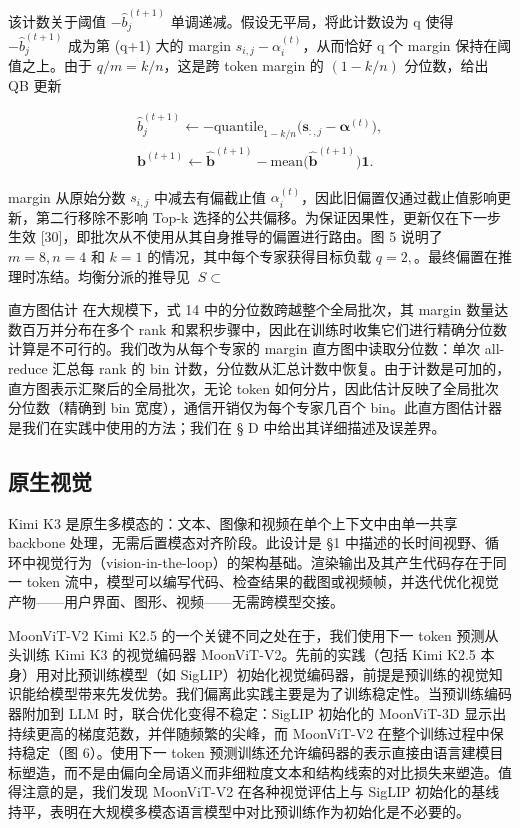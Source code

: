 该计数关于阈值 \(- \widehat { b } _ { j } ^ { ( t + 1 ) }\) 单调递减。假设无平局，将此计数设为 q 使得 \(- \widehat { b } _ { j } ^ { ( t + 1 ) }\) 成为第 (q+1) 大的 margin \(s _ { i , j } - \alpha _ { i } ^ { ( t ) }\)，从而恰好 q 个 margin 保持在阈值之上。由于 \(q / m = k / n\)，这是跨 token margin 的 \(( 1 - k / n )\) 分位数，给出 QB 更新

\[
\begin{array}{l} \widehat {b} _ {j} ^ {(t + 1)} \leftarrow - \text {quantile} _ {1 - k / n} \Big (\boldsymbol {s} _ {:, j} - \boldsymbol {\alpha} ^ {(t)} \Big), \\ \boldsymbol {b} ^ {(t + 1)} \leftarrow \widehat {\boldsymbol {b}} ^ {(t + 1)} - \text {mean} \Big (\widehat {\boldsymbol {b}} ^ {(t + 1)} \Big)   \mathbf {1}. \end{array}\tag{14}
\]

margin 从原始分数 \(s _ { i , j }\) 中减去有偏截止值 \(\alpha _ { i } ^ { ( t ) }\)，因此旧偏置仅通过截止值影响更新，第二行移除不影响 Top-k 选择的公共偏移。为保证因果性，更新仅在下一步生效 {[}30{]}，即批次从不使用从其自身推导的偏置进行路由。图 5 说明了 \(m = 8 , n = 4\) 和 \(k = 1\) 的情况，其中每个专家获得目标负载 \(q = 2 ,\)。最终偏置在推理时冻结。均衡分派的推导见 \(\ S \subset\)

直方图估计 在大规模下，式 14 中的分位数跨越整个全局批次，其 margin 数量达数百万并分布在多个 rank 和累积步骤中，因此在训练时收集它们进行精确分位数计算是不可行的。我们改为从每个专家的 margin 直方图中读取分位数：单次 all-reduce 汇总每 rank 的 bin 计数，分位数从汇总计数中恢复。由于计数是可加的，直方图表示汇聚后的全局批次，无论 token 如何分片，因此估计反映了全局批次分位数（精确到 bin 宽度），通信开销仅为每个专家几百个 bin。此直方图估计器是我们在实践中使用的方法；我们在 § D 中给出其详细描述及误差界。

\subsection{原生视觉}\label{native-vision}

Kimi K3 是原生多模态的：文本、图像和视频在单个上下文中由单一共享 backbone 处理，无需后置模态对齐阶段。此设计是 §1 中描述的长时间视野、循环中视觉行为（vision-in-the-loop）的架构基础。渲染输出及其产生代码存在于同一 token 流中，模型可以编写代码、检查结果的截图或视频帧，并迭代优化视觉产物——用户界面、图形、视频——无需跨模型交接。

MoonViT-V2 Kimi K2.5 的一个关键不同之处在于，我们使用下一 token 预测从头训练 Kimi K3 的视觉编码器 MoonViT-V2。先前的实践（包括 Kimi K2.5 本身）用对比预训练模型（如 SigLIP）初始化视觉编码器，前提是预训练的视觉知识能给模型带来先发优势。我们偏离此实践主要是为了训练稳定性。当预训练编码器附加到 LLM 时，联合优化变得不稳定：SigLIP 初始化的 MoonViT-3D 显示出持续更高的梯度范数，并伴随频繁的尖峰，而 MoonViT-V2 在整个训练过程中保持稳定（图 6）。使用下一 token 预测训练还允许编码器的表示直接由语言建模目标塑造，而不是由偏向全局语义而非细粒度文本和结构线索的对比损失来塑造。值得注意的是，我们发现 MoonViT-V2 在各种视觉评估上与 SigLIP 初始化的基线持平，表明在大规模多模态语言模型中对比预训练作为初始化是不必要的。

